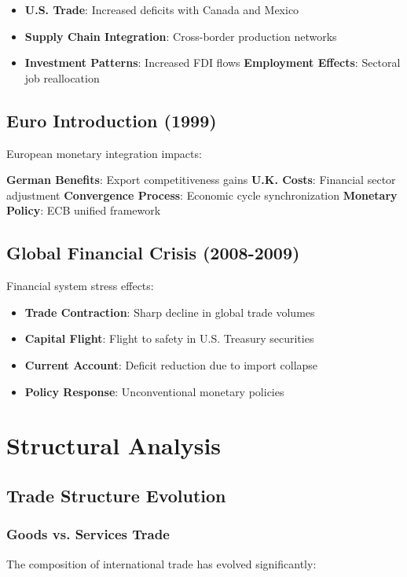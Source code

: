 \documentclass[11pt,a4paper]{article}
\begin{document}
\begin{itemize}
    \item \textbf{U.S. Trade}: Increased deficits with Canada and Mexico
    \item \textbf{Supply Chain Integration}: Cross-border production networks
    \item \textbf{Investment Patterns}: Increased FDI flows
    \textbf{Employment Effects}: Sectoral job reallocation
\end{itemize}

\subsection{Euro Introduction (1999)}
European monetary integration impacts:

\begin{itemize}
    \textbf{German Benefits}: Export competitiveness gains
    \textbf{U.K. Costs}: Financial sector adjustment
    \textbf{Convergence Process}: Economic cycle synchronization
    \textbf{Monetary Policy}: ECB unified framework
\end{itemize}

\subsection{Global Financial Crisis (2008-2009)}
Financial system stress effects:

\begin{itemize}
    \item \textbf{Trade Contraction}: Sharp decline in global trade volumes
    \item \textbf{Capital Flight}: Flight to safety in U.S. Treasury securities
    \item \textbf{Current Account}: Deficit reduction due to import collapse
    \item \textbf{Policy Response}: Unconventional monetary policies
\end{itemize}

\section{Structural Analysis}

\subsection{Trade Structure Evolution}

\subsubsection{Goods vs. Services Trade}
The composition of international trade has evolved significantly:
\end{document}

